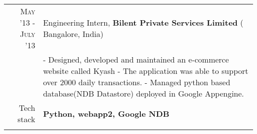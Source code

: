 \begin{tabular}{r|p{14cm}}
\textsc{May '13 - July '13 } & Engineering Intern, \textbf{Bilent Private Services Limited} ( Bangalore, India) \\
& \small{
- Designed, developed and maintained an e-commerce website called Kyash \newline 
- The application was able to support over 2000 daily transactions.\newline
- Managed python based database(NDB Datastore) deployed in Google Appengine.}\\
\small{Tech stack} &\footnotesize{\textbf{Python, webapp2, Google NDB}} \\
\multicolumn{2}{c}{}
\end{tabular}

